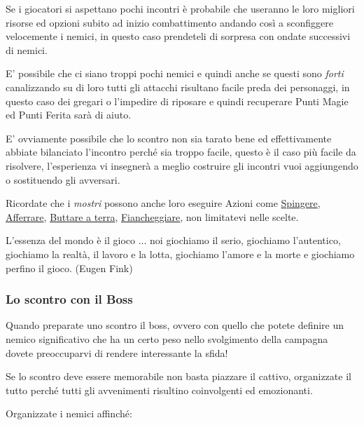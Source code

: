 \begin{multicols}{2}
Se i giocatori si aspettano pochi incontri è probabile che useranno le loro migliori risorse ed opzioni subito ad inizio combattimento andando così a sconfiggere velocemente i nemici, in questo caso prendeteli di sorpresa con ondate successivi di nemici.

E' possibile che ci siano troppi pochi nemici e quindi anche se questi sono \emph{forti} canalizzando su di loro tutti gli attacchi risultano facile preda dei personaggi, in questo caso dei gregari o l'impedire di riposare e quindi recuperare Punti Magie ed Punti Ferita sarà di aiuto.

E' ovviamente possibile che lo scontro non sia tarato bene ed effettivamente abbiate bilanciato l'incontro perché sia troppo facile, questo è il caso più facile da risolvere, l'esperienza vi insegnerà a meglio costruire gli incontri vuoi aggiungendo o sostituendo gli avversari.

Ricordate che i \emph{mostri} possono anche loro eseguire Azioni come \hyperlink{spingereavversario}{Spingere}, \hyperlink{afferrareunavversario}{Afferrare}, \hyperlink{farecadereavversario}{Buttare a terra}, \hyperlink{fiancheggiare}{Fiancheggiare}, non limitatevi nelle scelte.

\begin{enfasi}{
L'essenza del mondo è il gioco ... noi giochiamo il serio, giochiamo l'autentico, giochiamo la realtà, il lavoro e la lotta, giochiamo l'amore e la morte e giochiamo perfino il gioco. (Eugen Fink)
}\end{enfasi}

\subsubsection{Lo scontro con il Boss}

Quando preparate uno scontro il boss, ovvero con quello che potete definire un nemico significativo che ha un certo peso nello svolgimento della campagna dovete preoccuparvi di rendere interessante la sfida!

Se lo scontro deve essere memorabile non basta piazzare il cattivo, organizzate il tutto perché tutti gli avvenimenti risultino coinvolgenti ed emozionanti.

Organizzate i nemici affinché:

\begin{itemize}[leftmargin=*] \setlength{\itemsep}{-1pt}


\end{itemize}
\end{multicols}
